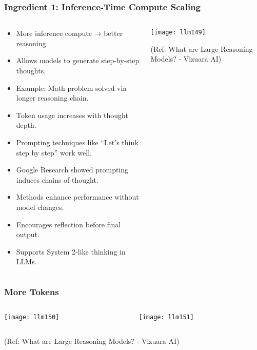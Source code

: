 \begin{frame}[fragile]\frametitle{Ingredient 1: Inference-Time Compute Scaling}

\begin{columns}
    \begin{column}[T]{0.6\linewidth}
		\begin{itemize}
		  \item More inference compute → better reasoning.
		  \item Allows models to generate step-by-step thoughts.
		  \item Example: Math problem solved via longer reasoning chain.
		  \item Token usage increases with thought depth.
		  \item Prompting techniques like “Let’s think step by step” work well.
		  \item Google Research showed prompting induces chains of thought.
		  \item Methods enhance performance without model changes.
		  \item Encourages reflection before final output.
		  \item Supports System 2-like thinking in LLMs.
		\end{itemize}

    \end{column}
    \begin{column}[T]{0.4\linewidth}
		\begin{center}
		\texttt{[image: llm149]}
		
		{\tiny (Ref: What are Large Reasoning Models? - Vizuara AI)}
		
		\end{center}
    \end{column}
  \end{columns}


\end{frame}

\begin{frame}[fragile]\frametitle{More Tokens}

\begin{columns}
    \begin{column}[T]{0.5\linewidth}
		\begin{center}
		\texttt{[image: llm150]}
		\end{center}

    \end{column}
    \begin{column}[T]{0.5\linewidth}
		\begin{center}
		\texttt{[image: llm151]}
		\end{center}
    \end{column}
  \end{columns}
  

{\tiny (Ref: What are Large Reasoning Models? - Vizuara AI)}

\end{frame}

